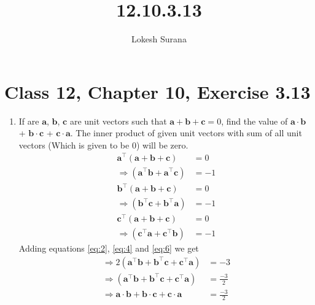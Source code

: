 \documentclass[journal,12pt,twocolumn]{IEEEtran}
\let\vec\mathbf
\begin{document}
\vspace{3cm}
\title{12.10.3.13}
\author{Lokesh Surana}
\maketitle
\section*{Class 12, Chapter 10, Exercise 3.13}
\begin{enumerate}[start=13]
\item  If are $\vec{a}$, $\vec{b}$, $\vec{c}$ are unit vectors such that $\vec{a} + \vec{b} + \vec{c} = {0}$, find the value of $\vec{a} \cdot \vec{b}$ + $\vec{b} \cdot \vec{c}$ + $\vec{c} \cdot \vec{a}$.
\break
\solution The inner product of given unit vectors with sum of all unit vectors (Which is given to be 0) will be zero.
\begin{align}
    \label{eq:1} \vec{a}^\top(\vec{a} + \vec{b} + \vec{c}) &= 0 \\
    \label{eq:2} \Rightarrow (\vec{a} ^\top \vec{b} + \vec{a} ^\top \vec{c}) &= -1\\
    \label{eq:3} \vec{b} ^\top (\vec{a} + \vec{b} + \vec{c}) &= 0 \\
    \label{eq:4} \Rightarrow (\vec{b} ^\top \vec{c} + \vec{b} ^\top \vec{a}) &= -1 \\
    \label{eq:5} \vec{c} ^\top (\vec{a} + \vec{b} + \vec{c}) &= 0 \\
    \label{eq:6} \Rightarrow (\vec{c} ^\top \vec{a} + \vec{c} ^\top \vec{b}) &= -1 
\end{align}
Adding equations \eqref{eq:2}, \eqref{eq:4} and \eqref{eq:6} we get
\begin{align}
    \Rightarrow 2(\vec{a} ^\top \vec{b} + \vec{b} ^\top \vec{c} + \vec{c} ^\top \vec{a}) &= -3 \\
    \Rightarrow (\vec{a} ^\top \vec{b} + \vec{b} ^\top \vec{c} + \vec{c} ^\top \vec{a}) &= \frac{-3}{2} \\
    \Rightarrow \vec{a} \cdot \vec{b} + \vec{b} \cdot \vec{c} + \vec{c} \cdot \vec{a} &= \frac{-3}{2}
\end{align}
\end {enumerate}
\end{document}
